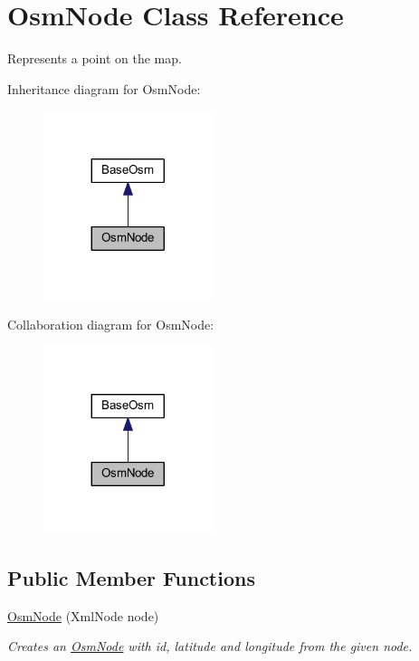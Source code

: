 \hypertarget{class_osm_node}{}\section{Osm\+Node Class Reference}
\label{class_osm_node}


Represents a point on the map.  




Inheritance diagram for Osm\+Node\+:\nopagebreak
\begin{figure}[H]
\begin{center}
\leavevmode
\includegraphics[width=140pt]{class_osm_node__inherit__graph}
\end{center}
\end{figure}


Collaboration diagram for Osm\+Node\+:\nopagebreak
\begin{figure}[H]
\begin{center}
\leavevmode
\includegraphics[width=140pt]{class_osm_node__coll__graph}
\end{center}
\end{figure}
\subsection*{Public Member Functions}
\begin{DoxyCompactItemize}
\item 
\mbox{\hyperlink{class_osm_node_a16217f3d8ba19dc3bab1da4e5b4e7a3a}{Osm\+Node}} (Xml\+Node node)
\begin{DoxyCompactList}\small\item\em Creates an \mbox{\hyperlink{class_osm_node}{Osm\+Node}} with id, latitude and longitude from the given node. \end{DoxyCompactList}\end{DoxyCompactItemize}
